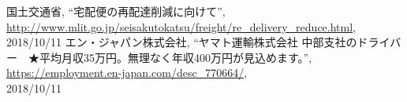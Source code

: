 \documentclass[a4j,titlepage]{jarticle}
\begin{document}
\begin{thebibliography}{9}

国土交通省,
\newblock ``宅配便の再配達削減に向けて'',\\
\newblock \url{http://www.mlit.go.jp/seisakutokatsu/freight/re_delivery_reduce.html}, \\
2018/10/11
エン・ジャパン株式会社,
\newblock ``ヤマト運輸株式会社 中部支社のドライバー　★平均月収35万円。無理なく年収400万円が見込めます。'',\\
\newblock \url{https://employment.en-japan.com/desc_770664/}, \\
2018/10/11
\end{thebibliography}
\end{document}
